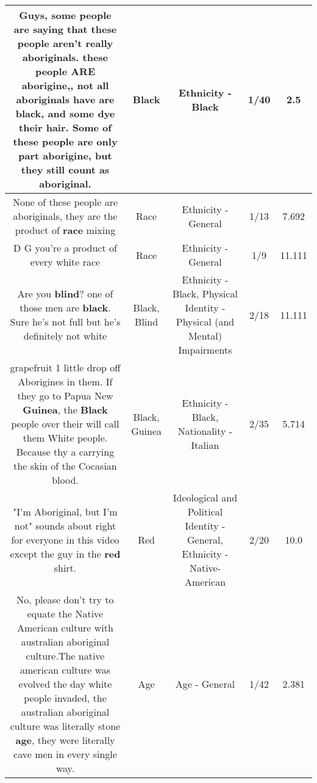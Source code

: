 \documentclass[11pt]{article}
\newlength\mylength
\begin{document}
\begin{center}
\begin{longtable}{|C{.65\mylength}|C{.30\mylength}|C{.12\mylength}|C{.12\mylength}|C{.12\mylength}|}
  \small Guys, some people are saying that these people aren't really aboriginals. these people ARE aborigine,, not all aboriginals have are \textbf{black}, and some dye their hair. Some of these people are only part aborigine, but they still count as aboriginal.\normalsize   & Black & Ethnicity - Black & 1/40 & 2.5 \\  \hline
  \small None of these people are aboriginals, they are the product of \textbf{race} mixing\normalsize   & Race & Ethnicity - General & 1/13 & 7.692 \\  \hline
  \small D G you're a product of every white race\normalsize   & Race & Ethnicity - General & 1/9 & 11.111 \\  \hline
  \small Are you \textbf{blind}? one of those men are \textbf{black}. Sure he's not full but he's definitely not white\normalsize   & Black, Blind & Ethnicity - Black, Physical Identity - Physical (and Mental) Impairments & 2/18 & 11.111 \\  \hline
  \small grapefruit 1 little drop off Aborigines in them. If they go to Papua New \textbf{Guinea}, the \textbf{Black} people over their will call them White people. Because thy a carrying the skin of the Cocasian blood.\normalsize   & Black, Guinea & Ethnicity - Black, Nationality - Italian & 2/35 & 5.714 \\  \hline
  \small "I'm Aboriginal, but I'm not" sounds about right for everyone in this video except the guy in the \textbf{r\textbf{ed}} shirt.\normalsize   & Red &  Ideological and Political Identity - General, Ethnicity - Native-American & 2/20 & 10.0 \\  \hline
  \small No, please don't try to equate the Native American culture with australian aboriginal culture.The native american culture was evolved the day white people invaded, the australian aboriginal culture was literally stone \textbf{age}, they were literally cave men in every single way.\normalsize   & Age & Age - General & 1/42 & 2.381 \\  \hline

\end{longtable}
\end{center}
\end{document}
